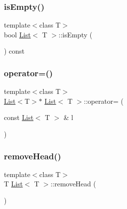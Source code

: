 \mbox{\label{class_list_a6ae0df0d666cd7df1873106cdad93e2a}} 
\subsubsection{\texorpdfstring{is\+Empty()}{isEmpty()}}
{\footnotesize\ttfamily template$<$class T$>$ \\
bool \hyperlink{class_list}{List}$<$ T $>$\+::is\+Empty (\begin{DoxyParamCaption}{ }\end{DoxyParamCaption}) const\hspace{0.3cm}{\ttfamily [inline]}}

\mbox{\label{class_list_a93c7a3166ef42cc92e3df4c03cc92b2f}} 
\subsubsection{\texorpdfstring{operator=()}{operator=()}}
{\footnotesize\ttfamily template$<$class T$>$ \\
\hyperlink{class_list}{List}$<$T$>$$\ast$ \hyperlink{class_list}{List}$<$ T $>$\+::operator= (\begin{DoxyParamCaption}\item[{const \hyperlink{class_list}{List}$<$ T $>$ \&}]{l }\end{DoxyParamCaption})\hspace{0.3cm}{\ttfamily [inline]}}

\mbox{\label{class_list_abf3f18858335e6cebb451c80d22edf6f}} 
\subsubsection{\texorpdfstring{remove\+Head()}{removeHead()}}
{\footnotesize\ttfamily template$<$class T$>$ \\
T \hyperlink{class_list}{List}$<$ T $>$\+::remove\+Head (\begin{DoxyParamCaption}{ }\end{DoxyParamCaption})\hspace{0.3cm}{\ttfamily [inline]}}



